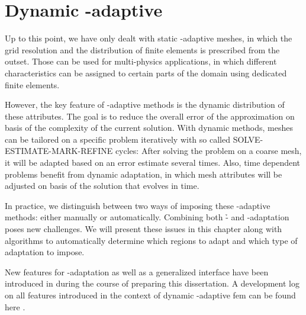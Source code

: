 \chapter{Dynamic \hp-adaptive }
\label{ch:dynamic}

Up to this point, we have only dealt with static \hp-adaptive meshes, in which the grid resolution and the distribution of finite elements is prescribed from the outset. Those can be used for multi-physics applications, in which different characteristics can be assigned to certain parts of the domain using dedicated finite elements.

However, the key feature of \hp-adaptive methods is the dynamic distribution of these attributes. The goal is to reduce the overall error of the approximation on basis of the complexity of the current solution. With dynamic methods, meshes can be tailored on a specific problem iteratively with so called SOLVE-ESTIMATE-MARK-REFINE cycles: After solving the problem on a coarse mesh, it will be adapted based on an error estimate several times. Also, time dependent problems benefit from dynamic adaptation, in which mesh attributes will be adjusted on basis of the solution that evolves in time.

In practice, we distinguish between two ways of imposing these \hp-adaptive methods: either manually or automatically. Combining both \h- and \p-adaptation poses new challenges. We will present these issues in this chapter along with algorithms to automatically determine which regions to adapt and which type of adaptation to impose.

New features for \hp-adaptation as well as a generalized interface have been introduced in \dealii{} during the course of preparing this dissertation. A development log on all features introduced in the context of dynamic \hp-adaptive \gls{fem} can be found here \cite{dealiiissue7515}.





